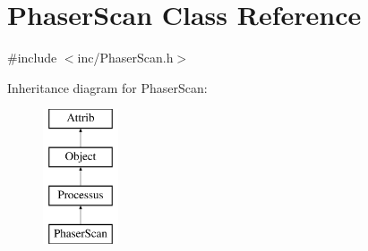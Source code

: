 \hypertarget{classPhaserScan}{}\section{Phaser\+Scan Class Reference}
\label{classPhaserScan}


{\ttfamily \#include $<$inc/\+Phaser\+Scan.\+h$>$}

Inheritance diagram for Phaser\+Scan\+:\begin{figure}[H]
\begin{center}
\leavevmode
\includegraphics[height=4.000000cm]{classPhaserScan}
\end{center}
\end{figure}
